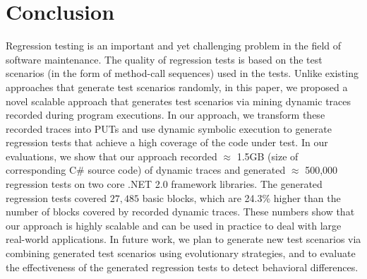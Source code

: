 \section{Conclusion}
\label{sec:concl}

Regression testing is an important and yet challenging problem in the field of software maintenance. The quality of regression tests is based on the test scenarios (in the form of method-call sequences) used in the tests. Unlike existing approaches that generate test scenarios randomly, in this paper, we proposed a novel scalable approach that generates test scenarios via mining dynamic traces recorded during program executions. In our approach, we transform these recorded traces into PUTs and use dynamic symbolic execution to generate regression tests that achieve a high coverage of the code under test. In our evaluations, we show that our approach recorded $\approx$ 1.5GB (size of corresponding C\# source code) of dynamic traces and generated $\approx$ 500,000 regression tests on two core .NET 2.0 framework libraries. The generated regression tests covered $27,485$ basic blocks, which are 24.3\% higher than the number of blocks covered by recorded dynamic traces. These numbers show that our approach is highly scalable and can be used in practice to deal with large real-world applications. In future work, we plan to generate new test scenarios via combining generated test scenarios using evolutionary strategies, and to evaluate the effectiveness of the generated regression tests to detect behavioral differences.